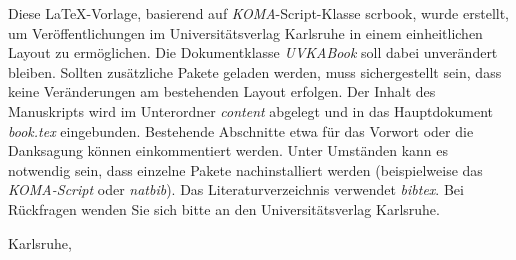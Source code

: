 \preface

Diese \LaTeX{}-Vorlage, basierend auf \emph{KOMA}-Script-Klasse scrbook, wurde erstellt, um Veröffentlichungen im Universitätsverlag Karlsruhe in einem einheitlichen Layout zu ermöglichen. Die Dokumentklasse \emph{UVKABook} soll dabei unverändert bleiben. Sollten zusätzliche Pakete geladen werden, muss sichergestellt sein, dass keine Veränderungen am bestehenden Layout erfolgen. Der Inhalt des Manuskripts wird im Unterordner \emph{content} abgelegt und in das Hauptdokument \emph{book.tex} eingebunden. Bestehende Abschnitte etwa für das Vorwort oder die Danksagung können einkommentiert werden. Unter Umständen kann es notwendig sein, dass einzelne Pakete nachinstalliert werden (beispielweise das \emph{KOMA-Script} oder \emph{natbib}). Das Literaturverzeichnis verwendet \emph{bibtex}. Bei Rückfragen wenden Sie sich bitte an den Universitätsverlag Karlsruhe.

\vspace{1cm}
\begin{flushright}\noindent
    Karlsruhe,\hfill {\it \myname}\\
    \releasemonth \hfill { }
\end{flushright}